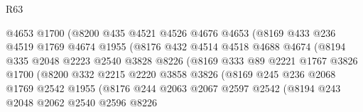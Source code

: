 \begin{lexlean}{R63}
\begin{coremodule}
                            @4653
                            @1700
                            (@8200
                              @435
                              @4521
                              @4526
                              @4676
                              @4653
                              (@8169
                                @433
                                @236
                                @4519
                                @1769
                                @4674
                                @1955
                                (@8176
                                  @432
                                  @4514
                                  @4518
                                  @4688
                                  @4674
                                  (@8194
                                    @335
                                    @2048
                                    @2223
                                    @2540
                                    @3828
                                    @8226
                                    (@8169
                                      @333
                                      @89
                                      @2221
                                      @1767
                                      @3826
                                      @1700
                                      (@8200
                                        @332
                                        @2215
                                        @2220
                                        @3858
                                        @3826
                                        (@8169
                                          @245
                                          @236
                                          @2068
                                          @1769
                                          @2542
                                          @1955
                                          (@8176
                                            @244
                                            @2063
                                            @2067
                                            @2597
                                            @2542
                                            (@8194
                                              @243
                                              @2048
                                              @2062
                                              @2540
                                              @2596
                                              @8226

\end{coremodule}
\end{lexlean}
